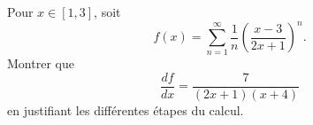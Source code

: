 

\begin{exercice}\label{exo_I-1-14}

Pour $x\in[1,3]$, soit
\begin{equation}
	f(x)=\sum_{n=1}^{\infty}\frac{1}{ n }\left( \frac{ x-3 }{ 2x+1 } \right)^n.
\end{equation}
Montrer que 
\begin{equation}
	\frac{ df }{ dx }=\frac{ 7 }{ (2x+1)(x+4) }
\end{equation}
en justifiant les différentes étapes du calcul.

\end{exercice}
